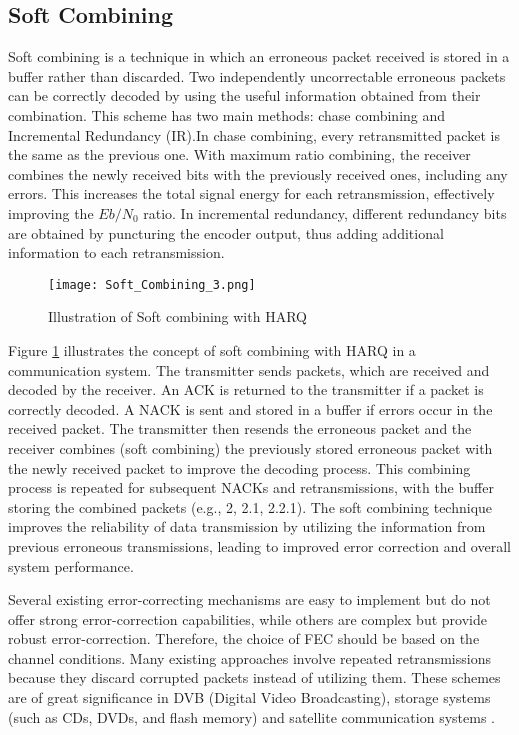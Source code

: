 \documentclass[sn-mathphys-num]{sn-jnl}
\theoremstyle{thmstyleone}
\theoremstyle{thmstyletwo}%
\theoremstyle{thmstylethree}%
\begin{document}
\subsection{Soft Combining} \label{s1.4}

Soft combining \cite{r15} is a technique in which an erroneous packet received is stored in a buffer rather than discarded. Two independently uncorrectable erroneous packets can be correctly decoded by using the useful information obtained from their combination. This scheme has two main methods: chase combining and Incremental Redundancy (IR).In chase combining, every retransmitted packet is the same as the previous one. With maximum ratio combining, the receiver combines the newly received bits with the previously received ones, including any errors. This increases the total signal energy for each retransmission, effectively improving the $Eb/N_0$ ratio. In incremental redundancy, different redundancy bits are obtained by puncturing the encoder output, thus adding additional information to each retransmission.

\begin{figure}[H]
    \centering
    \texttt{[image: Soft\_Combining\_3.png]}
    \caption{Illustration of Soft combining with HARQ  \cite{r23}}
    \label{fig:10}
\end{figure}

Figure \ref{fig:10} illustrates the concept of soft combining with HARQ in a communication system. The transmitter sends packets, which are received and decoded by the receiver. An ACK is returned to the transmitter if a packet is correctly decoded. A NACK is sent and stored in a buffer if errors occur in the received packet. The transmitter then resends the erroneous packet and the receiver combines (soft combining) the previously stored erroneous packet with the newly received packet to improve the decoding process. This combining process is repeated for subsequent NACKs and retransmissions, with the buffer storing the combined packets (e.g., 2, 2.1, 2.2.1). The soft combining technique improves the reliability of data transmission by utilizing the information from previous erroneous transmissions, leading to improved error correction and overall system performance.

Several existing error-correcting mechanisms are easy to implement but do not offer strong error-correction capabilities, while others are complex but provide robust error-correction. Therefore, the choice of FEC \cite{r14} should be based on the channel conditions. Many existing approaches involve repeated retransmissions because they discard corrupted packets instead of utilizing them. These schemes are of great significance in DVB (Digital Video Broadcasting), storage systems (such as CDs, DVDs, and flash memory) and satellite communication systems \cite{r18}.
\end{document}
